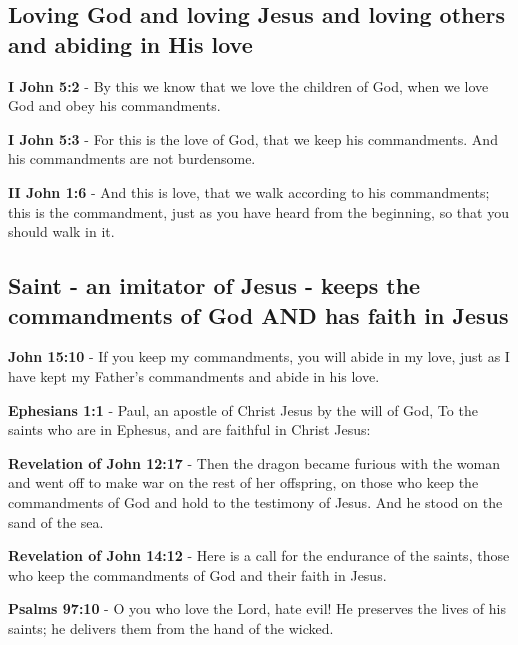 \documentclass[11pt]{article}
\begin{document}
\subsection{Loving God and loving Jesus and loving others and abiding in His love}
\label{sec:orgd0f2397}
\textbf{I John 5:2} - By this we know that we love the children of God, when we love God and obey his commandments.

\textbf{I John 5:3} - For this is the love of God, that we keep his commandments. And his commandments are not burdensome.

\textbf{II John 1:6} - And this is love, that we walk according to his commandments; this is the commandment, just as you have heard from the beginning, so that you should walk in it.

\subsection{Saint - an imitator of Jesus - keeps the commandments of God AND has faith in Jesus}
\label{sec:org37dc478}
\textbf{John 15:10} - If you keep my commandments, you will abide in my love, just as I have kept my Father's commandments and abide in his love.

\textbf{Ephesians 1:1} - Paul, an apostle of Christ Jesus by the will of God, To the saints who are in Ephesus, and are faithful in Christ Jesus:

\textbf{Revelation of John 12:17} - Then the dragon became furious with the woman and went off to make war on the rest of her offspring, on those who keep the commandments of God and hold to the testimony of Jesus. And he stood on the sand of the sea.

\textbf{Revelation of John 14:12} - Here is a call for the endurance of the saints, those who keep the commandments of God and their faith in Jesus.

\textbf{Psalms 97:10} - O you who love the Lord, hate evil! He preserves the lives of his saints; he delivers them from the hand of the wicked.
\end{document}
